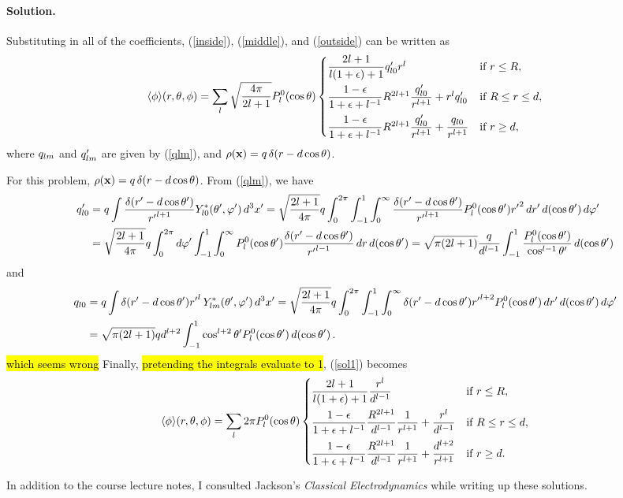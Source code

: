 \documentclass[11pt]{article}
\newcommand{\refeq}[1]{(\ref{#1})}
\newcommand{\beq}{\begin{equation*}}
\newcommand{\eeq}{\end{equation*}}
\newcommand{\beqn}{\begin{equation}}
\newcommand{\eeqn}{\end{equation}}
\newenvironment{solution}
{
    \paragraph{Solution.}
    \ignorespaces
}
{
    \bigskip
}
\begin{document}
\begin{solution}
	Substituting in all of the coefficients, \refeq{inside}, \refeq{middle}, and \refeq{outside} can be written as
	\beqn \label{sol1}
		\evphi\!\rtp = \sum_{l} \sqrt{\frac{4\pi}{2l+1}} \Ploct \begin{cases}
			\dfrac{2l + 1}{l (1 + \eps) + 1} \qplo r^l & \tif r \leq R, \\[2ex]
			\dfrac{1 - \eps}{1 + \eps + l^{-1}} R^{2l+1} \dfrac{\qplo}{r^{l+1}} + r^l \qplo & \tif R \leq r \leq d, \\[2ex]
			\dfrac{1 - \eps}{1 + \eps + l^{-1}} R^{2l+1} \dfrac{\qplo}{r^{l+1}} + \dfrac{\qlo}{r^{l+1}} & \tif r \geq d,
		\end{cases}
	\eeqn
	where $q_{l m}$ and $q'_{l m}$ are given by \refeq{qlm}, and $\rho(\vb{x}) = q \,\delta(r - d\cos\theta)$.

	For this problem, $\rho(\vb{x}) = q \,\delta(r - d\cos\theta)$.  From \refeq{qlm}, we have
	\begin{align*}
		q'_{l 0} &= q \int \frac{\delta(r' - d\cos\theta')}{{r'}^{l+1}} Y_{l 0}^*(\theta', \varphi') \dd[3]{x'}
		= \sqrt{\frac{2l + 1}{4\pi}} q \int_0^{2\pi} \int_{-1}^{1} \int_0^\infty \frac{\delta(r' - d\cos\theta')}{{r'}^{l+1}} P_l^0(\cos\theta') {r'}^2 \dd{r'} \dd{(\cos\theta')} \dd{\varphi'} \\
		&= \sqrt{\frac{2l + 1}{4\pi}} q \int_0^{2\pi} \dd{\varphi'} \int_{-1}^{1} \int_0^\infty P_l^0(\cos\theta') \frac{\delta(r' - d\cos\theta')}{{r'}^{l-1}} \dd{r} \dd{(\cos\theta')}
		= \sqrt{\pi (2l + 1)} \frac{q}{d^{l-1}} \int_{-1}^{1} \frac{P_l^0(\cos\theta')}{\cos^{l-1}\theta'} \dd{(\cos\theta')}
	\end{align*}
	and
	\begin{align*}
		q_{l 0} &= q \int \delta(r' - d\cos\theta') {r'}^l \, Y_{l m}^*(\theta', \varphi') \dd[3]{x'}
		= \sqrt{\frac{2l + 1}{4\pi}} q \int_0^{2\pi} \int_{-1}^{1} \int_0^\infty \delta(r' - d\cos\theta') {r'}^{l+2} P_l^0(\cos\theta') \dd{r'} \dd{(\cos\theta')} \dd{\varphi'} \\
		&= \sqrt{\pi (2l + 1)} q d^{l+2} \int_{-1}^{1} \cos^{l+2}\theta' P_l^0(\cos\theta') \dd{(\cos\theta')}.
	\end{align*}
	\hl{which seems wrong}
	Finally, \hl{pretending the integrals evaluate to 1}, \refeq{sol1} becomes
	\beq
		\evphi\!\rtp = \sum_{l} 2\pi \Ploct \begin{cases}
			\dfrac{2l + 1}{l (1 + \eps) + 1} \dfrac{r^l}{d^{l-1}} & \tif r \leq R, \\[2ex]
			\dfrac{1 - \eps}{1 + \eps + l^{-1}} \dfrac{R^{2l+1}}{d^{l-1}} \dfrac{1}{r^{l+1}} + \dfrac{r^l}{d^{l-1}} & \tif R \leq r \leq d, \\[2ex]
			\dfrac{1 - \eps}{1 + \eps + l^{-1}} \dfrac{R^{2l+1}}{d^{l-1}} \dfrac{1}{r^{l+1}} + \dfrac{d^{l+2}}{r^{l+1}} & \tif r \geq d.
		\end{cases}
	\eeq
\end{solution}


\clearpage




\vfill
In addition to the course lecture notes, I consulted Jackson's \emph{Classical Electrodynamics} while writing up these solutions.
\end{document}
